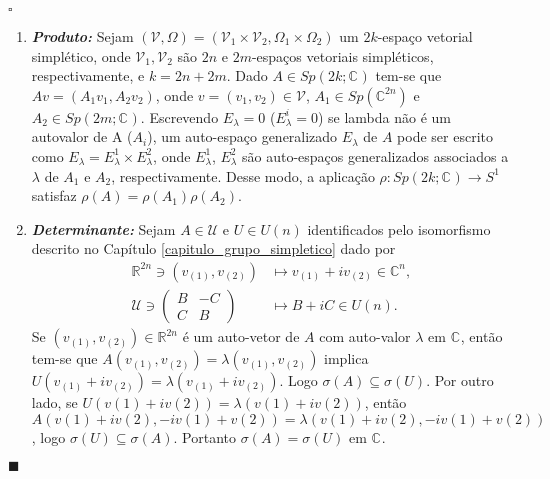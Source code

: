 \documentclass[12pt]{book}
\newenvironment{prova}[1]{$\square$ #1}{\hfill$\blacksquare$}
\newcommand{\circulo}{S^{1}}
\newcommand{\complexificado}[1]{\mathcal{#1}}
\newcommand{\complexo}[1]{\mathbb{C}^{#1}}
\newcommand{\espectrooperador}[1]{\sigma(#1)}
\newcommand{\gruposimpletico}[1]{Sp(#1)}
\newcommand{\gruposimpleticocomplexo}[1]{Sp(#1; \complexo{})}
\newcommand{\matrizunitaria}[1]{U(#1)}
\newcommand{\real}[1]{\mathbb{R}^{#1}}
\begin{document}
\begin{prova}
\begin{enumerate}
			\item \textbf{\textit{Produto:}} Sejam $(\complexificado{V}, \Omega) = (\complexificado{V}_{1}\times \complexificado{V}_{2}, \Omega_{1}\times \Omega_{2})$ um $2k$-espaço vetorial simplético, onde $\complexificado{V}_{1}, \complexificado{V}_{2}$ são $2n$ e $2m$-espaços vetoriais simpléticos, respectivamente, e $k=2n+2m$. Dado $A \in \gruposimpleticocomplexo{2k}$ tem-se que $Av = (A_{1}v_{1}, A_{2}v_{2})$, onde $v=(v_{1}, v_{2}) \in \complexificado{V}$, $A_{1}\in \gruposimpletico{\complexo{2n}}$ e $A_{2}\in \gruposimpleticocomplexo{2m}$. Escrevendo $E_\lambda=0$ ($E_\lambda^i=0$) se lambda não é um autovalor de A ($A_i$), um auto-espaço generalizado $E_{\lambda}$ de $A$ pode ser escrito como $E_{\lambda} = E_{\lambda}^{1}\times E_{\lambda}^{2}$, onde $E_{\lambda}^{1}$, $E_{\lambda}^{2}$ são auto-espaços generalizados associados a $\lambda$ de $A_{1}$ e $A_{2}$, respectivamente. Desse modo, a aplicação $\rho: \gruposimpleticocomplexo{2k} \to \circulo$ satisfaz $\rho(A) = \rho(A_{1})\rho(A_{2})$.
			
			\item \textbf{\textit{Determinante:}} Sejam $A \in \mathcal{U}$ e $U \in \matrizunitaria{n}$ identificados pelo isomorfismo descrito no Capítulo \ref{capitulo_grupo_simpletico} dado por
			$$
			\begin{aligned}
				\real{2n} \ni (v_{(1)},v_{(2)}) &\mapsto v_{(1)}+iv_{(2)} \in \complexo{n},
				\\
				\mathcal{U} \ni 
				\left(
					\begin{array}{cc}
					B & -C
					\\
					C & B
					\end{array}
				\right) 
				& \mapsto B+iC \in \matrizunitaria{n}.
			\end{aligned}
			$$
			Se $(v_{(1)},v_{(2)}) \in \real{2n}$ é um auto-vetor de $A$ com auto-valor $\lambda$ em $\complexo{}$, então tem-se que $A(v_{(1)},v_{(2)})=\lambda (v_{(1)},v_{(2)}) $ implica $U(v_{(1)}+iv_{(2)}) = \lambda(v_{(1)}+iv_{(2)})$. Logo $\espectrooperador{A} \subseteq \espectrooperador{U}$. Por outro lado, se $U(v(1)+iv(2))=\lambda(v(1)+iv(2))$, então $A(v(1)+iv(2), -iv(1)+v(2))=\lambda (v(1)+iv(2), -iv(1)+v(2))$, logo $\espectrooperador{U} \subseteq\espectrooperador{A}$. Portanto $\espectrooperador{A} =\espectrooperador{U}$ em $\complexo{}$.
			

\end{enumerate}
\end{prova}
\end{document}
